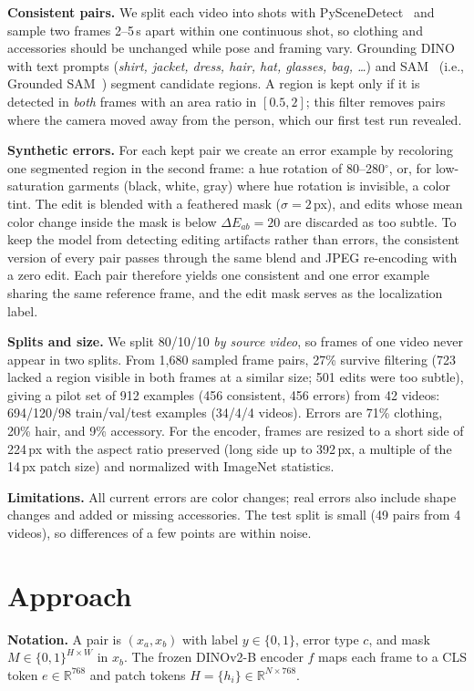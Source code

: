\documentclass{article}
\begin{document}
\textbf{Consistent pairs.} We split each video into shots with PySceneDetect~\cite{pyscenedetect} and
sample two frames 2--5\,s apart within one continuous shot, so clothing and accessories should be
unchanged while pose and framing vary. Grounding DINO~\cite{liu2024grounding} with text prompts
(\emph{shirt, jacket, dress, hair, hat, glasses, bag, \dots}) and SAM~\cite{kirillov2023segment}
(i.e., Grounded SAM~\cite{grounded_sam}) segment candidate regions. A region is kept only if it is
detected in \emph{both} frames with an area ratio in $[0.5, 2]$; this filter removes pairs where the
camera moved away from the person, which our first test run revealed.

\textbf{Synthetic errors.} For each kept pair we create an error example by recoloring one segmented
region in the second frame: a hue rotation of 80--280$^\circ$, or, for low-saturation garments (black,
white, gray) where hue rotation is invisible, a color tint. The edit is blended with a feathered mask
($\sigma=2$\,px), and edits whose mean color change inside the mask is below $\Delta E_{ab}=20$ are
discarded as too subtle. To keep the model from detecting editing artifacts rather than errors, the
consistent version of every pair passes through the same blend and JPEG re-encoding with a zero edit.
Each pair therefore yields one consistent and one error example sharing the same reference frame, and
the edit mask serves as the localization label.

\textbf{Splits and size.} We split 80/10/10 \emph{by source video}, so frames of one video never appear
in two splits. From 1{,}680 sampled frame pairs, 27\% survive filtering (723 lacked a region visible in both
frames at a similar size; 501 edits were too subtle), giving a pilot set of 912 examples (456 consistent,
456 errors) from 42 videos: 694/120/98 train/val/test examples (34/4/4 videos). Errors are 71\% clothing,
20\% hair, and 9\% accessory. For the encoder, frames are resized to a short side of 224\,px with the aspect ratio
preserved (long side up to 392\,px, a multiple of the 14\,px patch size) and normalized with ImageNet
statistics.

\textbf{Limitations.} All current errors are color changes; real errors also include shape changes and
added or missing accessories. The test split is small (49 pairs from 4 videos), so
differences of a few points are within noise.

\section{Approach}
\textbf{Notation.} A pair is $(x_a, x_b)$ with label $y\in\{0,1\}$, error type $c$, and mask
$M\in\{0,1\}^{H\times W}$ in $x_b$. The frozen DINOv2-B encoder $f$ maps each frame to a CLS token
$e\in\mathbb{R}^{768}$ and patch tokens $H=\{h_i\}\in\mathbb{R}^{N\times 768}$.
\end{document}
